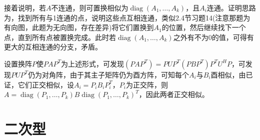 \documentclass[a4paper,UTF8,fontset=windows]{ctexart}
\DeclareMathOperator{\diag}{diag}
\begin{document}
\begin{enumerate}
接着说明，若$A$不连通，则可置换相似为$\diag(A_1,\dots,A_k)$，且$A_i$连通。证明思路为，找到所有与1连通的点，说明这些点互相连通，类似2.4节习题14(注意那题为有向图，此题为无向图，存在差异)将它们置换到$A_1$的位置，然后继续找下一个点，直到所有点被置换完成。此时若$\diag(A_1,\dots,A_k)$之外有不为0的值，可得有更大的互相连通的分支，矛盾。

设置换阵$P$使$PAP^T$为上述形式，可发现$(PAP^T)=PUP^T(PBP^T)P^TU^HP$，可发现$PUP^T$仍为对角阵，由于其主子矩阵仍为酉方阵，可知每个$A_i$与$B_i$酉相似，由已证，它们正交相似，设$A_i=P_iB_iP_i^T$，$P_i$为正交阵，则$A=\diag(P_1,\dots,P_k)B\diag(P_1,\dots,P_k)^T$，因此两者正交相似。
\end{enumerate}

\section{二次型}
\end{document}
